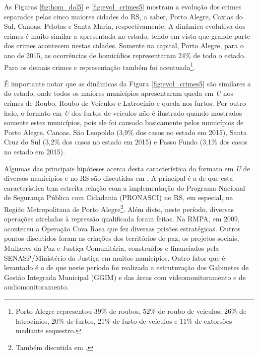 \documentclass[12pt,openright,oneside,a4paper,english,french,spanish]{abntex2}
\numberwithin{table}{section} %
\numberwithin{figure}{section} %
\newcommand{\co}{\citeonline}
\begin{document}
As Figuras \ref{fig:hom_dol5} e \ref{fig:evol_crimes5} mostram a evolução dos crimes separados pelas cinco maiores cidades do RS, a saber, Porto Alegre, Caxias do Sul, Canoas, Pelotas e Santa Maria, respectivamente. A dinâmica evolutiva dos crimes é muito similar a apresentada no estado, tendo em vista que grande parte dos crimes acontecem nestas cidades. Somente na capital, Porto Alegre, para o ano de 2015, as ocorrências de homicídios representaram 24\% de todo o estado. Para os demais crimes e representação também foi acentuada\footnote{Porto Alegre representou 39\% de roubos, 52\% de roubo de veículos, 26\% de latrocínios, 20\% de furtos, 21\% de furto de veículos e 11\% de extorsões mediante sequestro.}.

É importante notar que as dinâmicas da Figura \ref{fig:evol_crimes5} são similares a do estado, onde todos os maiores municípios apresentaram queda em \textit{U} nos crimes de Roubo, Roubo de Veículos e Latrocínio e queda nos furtos. Por outro lado, o formato em \textit{U} dos furtos de veículos não é ilustrado quando mostrados somente estes municípios, pois ele foi causado basicamente pelos municípios de Porto Alegre, Canoas, São Leopoldo (3,9\% dos casos no estado em 2015), Santa Cruz do Sul (3,2\% dos casos no estado em 2015) e Passo Fundo (3,1\% dos casos no estado em 2015).

Algumas das principais hipóteses acerca desta característica do formato em \textit{U} de diversos municípios e no RS são discutidas em \co{kerber2016}. A principal é a de que esta característica tem estreita relação com a implementação do Programa Nacional de Segurança Pública com Cidadania (PRONASCI) no RS, em especial, na Região Metropolitana de Porto Alegre\footnote{Também discutida em \co{cidade2012implementaccao}.}. Além disto, neste período, diversas operações atreladas à repressão qualificada foram feitas. Na RMPA, em 2009, aconteceu a Operação Cova Rasa que fez diversas prisões estratégicas. Outros pontos discutidos foram as criações dos territórios de paz, os projetos sociais, Mulheres da Paz e Justiça Comunitária, construídos e financiados pela SENASP/Ministério da Justiça em muitos municípios. Outro fator que é levantado é o de que neste período foi realizada a estruturação dos Gabinetes de Gestão Integrada Municipal (GGIM) e das áreas com videomonitoramento e de audiomonitoramento. 
\end{document}
